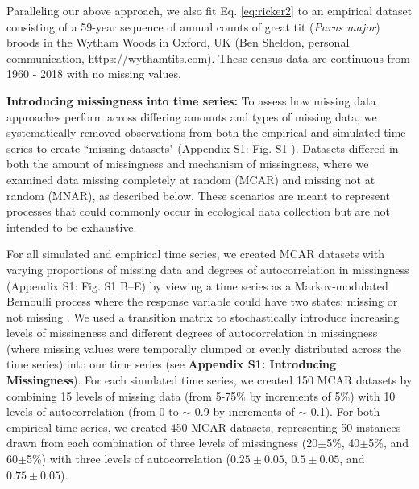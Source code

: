 \documentclass[12pt,english]{article} %
\begin{document}
\begin{linenumbers}
\begin{spacing}{1.9}
\begin{flushleft}
\hspace{1em} Paralleling our above approach, we also fit Eq. \ref{eq:ricker2} to an empirical dataset consisting of a 59-year sequence of annual counts of great tit (\textit{Parus major}) broods in the Wytham Woods in Oxford, UK (Ben Sheldon, personal communication, https://wythamtits.com). These census data are continuous from 1960 - 2018 with no missing values. %


\textbf{Introducing missingness into time series:} To assess how missing data approaches perform across differing amounts and types of missing data, we systematically removed observations from both the empirical and simulated time series to create ``missing datasets" (Appendix S1: Fig. S1%
). Datasets differed in both the amount of missingness and mechanism of missingness, where we examined data missing completely at random (MCAR) and missing not at random (MNAR), as described below. These scenarios are meant to represent processes that could commonly occur in ecological data collection but are not intended to be exhaustive.

\hspace{1em} For all simulated and empirical time series, we created MCAR datasets with varying proportions of missing data and degrees of autocorrelation in missingness (Appendix S1: Fig. S1 B--E) by viewing a time series as a Markov-modulated Bernoulli process where the response variable could have two states: missing or not missing \citep{Gharib2014, Edwards1960}. We used a transition matrix to stochastically introduce increasing levels of missingness and different degrees of autocorrelation in missingness (where  missing values were temporally clumped or evenly distributed across the time series) into our time series (see \textbf{Appendix S1: Introducing Missingness}). For each simulated time series, we created 150 MCAR datasets by combining 15 levels of missing data (from 5-75\% by increments of 5\%) with 10 levels of autocorrelation (from 0 to $\sim$ 0.9 by increments of $\sim$ 0.1). For both empirical time series, we created 450 MCAR datasets, representing 50 instances drawn from each combination of three levels of missingness (20$\pm$5\%, 40$\pm$5\%, and 60$\pm$5\%) with three levels of autocorrelation ($0.25\pm0.05$, $0.5\pm0.05$, and $0.75\pm0.05$).


\end{flushleft}
\end{spacing}
\end{linenumbers}
\end{document}
